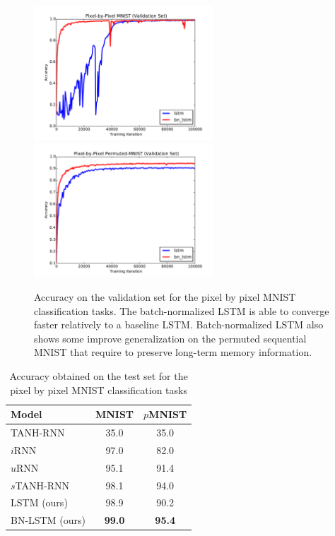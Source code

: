 \documentclass{article} %
\begin{document}
\begin{figure}[!t]
\center
\includegraphics[width=6.7cm]{figures/unpermuted_valid.pdf}
\includegraphics[width=6.7cm]{figures/permuted_valid.pdf}
\caption{Accuracy on the validation set for the pixel by pixel MNIST classification tasks. The batch-normalized LSTM is able to converge faster relatively to a baseline LSTM.
  Batch-normalized  LSTM also shows some improve generalization on the permuted sequential MNIST that require to preserve long-term memory information.}
\label{fig:seqmnist_valid}
\end{figure}



\begin{table}[!hb]
\center
\begin{tabular}{@{}lcc@{}}
  \toprule
  \bf Model & \bf MNIST & \bf $p$MNIST \\
  \midrule
  TANH-RNN~\citep{le2015simple} & 35.0 & 35.0\\
  $i$RNN~\citep{le2015simple} & 97.0 & 82.0\\
  $u$RNN~\citep{urnn} & 95.1 & 91.4\\
  $s$TANH-RNN~\citep{zhang2016architectural} & 98.1 & 94.0\\
  \midrule
  LSTM (ours) & 98.9 & 90.2\\
  BN-LSTM (ours) & \textbf{99.0} & \textbf{95.4}\\
  \bottomrule
\end{tabular}
\caption{Accuracy obtained on the test set for the pixel by pixel MNIST classification tasks}
\label{tab:seqmnist_test}

\end{table}
\end{document}

